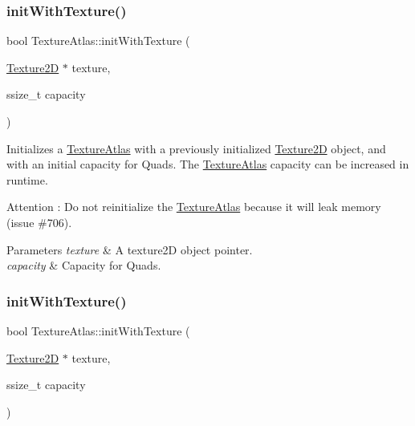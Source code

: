 \subsubsection{\texorpdfstring{init\+With\+Texture()}{initWithTexture()}\hspace{0.1cm}{\footnotesize\ttfamily [1/2]}}
{\footnotesize\ttfamily bool Texture\+Atlas\+::init\+With\+Texture (\begin{DoxyParamCaption}\item[{\hyperlink{classTexture2D}{Texture2D} $\ast$}]{texture,  }\item[{ssize\+\_\+t}]{capacity }\end{DoxyParamCaption})}

Initializes a \hyperlink{classTextureAtlas}{Texture\+Atlas} with a previously initialized \hyperlink{classTexture2D}{Texture2D} object, and with an initial capacity for Quads. The \hyperlink{classTextureAtlas}{Texture\+Atlas} capacity can be increased in runtime. \begin{DoxyAttention}{Attention}
\+: Do not reinitialize the \hyperlink{classTextureAtlas}{Texture\+Atlas} because it will leak memory (issue \#706). 
\end{DoxyAttention}

\begin{DoxyParams}{Parameters}
{\em texture} & A texture2D object pointer. \\
\hline
{\em capacity} & Capacity for Quads. \\
\hline
\end{DoxyParams}
\mbox{\label{classTextureAtlas_a44ea8a3d38f0e758e33c6b10c725b44b}} 
\subsubsection{\texorpdfstring{init\+With\+Texture()}{initWithTexture()}\hspace{0.1cm}{\footnotesize\ttfamily [2/2]}}
{\footnotesize\ttfamily bool Texture\+Atlas\+::init\+With\+Texture (\begin{DoxyParamCaption}\item[{\hyperlink{classTexture2D}{Texture2D} $\ast$}]{texture,  }\item[{ssize\+\_\+t}]{capacity }\end{DoxyParamCaption})}

